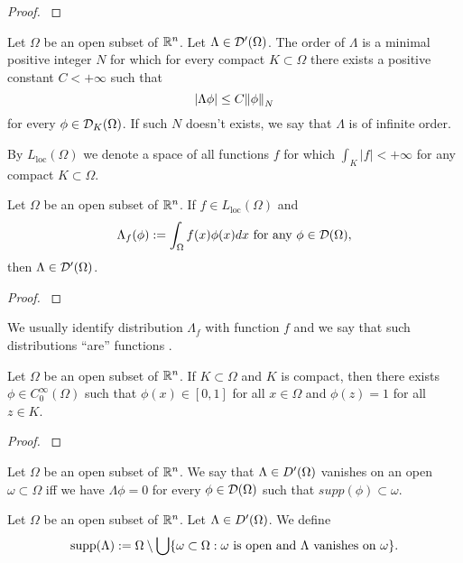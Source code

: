 \documentclass[main.tex]{subfiles}
\begin{document}
\begin{proof}
\cite[see][6.8]{rudin1991}
\end{proof}
\begin{definition}
\label{distribution-order}
Let $\Omega$ be an open subset of $\mathbb{R}^n$. Let $\Lambda\in\mathcal{D}'(\Omega)$. The order of $\Lambda$ is a minimal positive integer $N$ for which for every compact $K\subset\Omega$ there exists a positive constant $C<+\infty$ such that
\begin{equation}
|\Lambda\phi| \leq C\norm{\phi}_N
\end{equation}
for every $\phi\in\mathcal{D}_K(\Omega)$.
If such $N$ doesn't exists, we say that $\Lambda$ is of infinite order.
\end{definition}
By $L_\text{loc}(\Omega)$ we denote a space of all functions $f$ for which $\int_K |f| < +\infty$ for any compact $K\subset \Omega$.
\begin{theorem}
Let $\Omega$ be an open subset of $\mathbb{R}^n$. If $f\in L_\text{loc}(\Omega)$ and 
\begin{equation}
\Lambda_f(\phi) := \int_\Omega f(x)\phi(x)dx \text{ for any } \phi\in\mathcal{D}(\Omega),
\end{equation}
then $\Lambda\in\mathcal{D}'(\Omega)$.
\end{theorem}
\begin{proof}
\cite[see][6.11]{rudin1991}
\end{proof}
We usually identify distribution $\Lambda_f$ with function $f$ and we say that such distributions ``are'' functions \cite[see][6.11]{rudin1991}.
\begin{theorem}
\label{probe-function-compact-aprox}
Let $\Omega$ be an open subset of $\mathbb{R}^n$. If $K\subset\Omega$ and $K$ is compact, then there exists $\phi\in C^\infty_0(\Omega)$ such that $\phi(x)\in[0,1]$ for all $x\in\Omega$ and $\phi(z) = 1$ for all $z\in K$. 
\end{theorem}
\begin{proof}
\cite[see][Chapter 3. Sobolev Spaces. 3.1. Introduction]{miklavcic1998}
\end{proof}
\begin{definition}
Let $\Omega$ be an open subset of $\mathbb{R}^n$. We say that 
$\Lambda\in\\D'(\Omega)$ vanishes on an open $\omega\subset\Omega$ iff
we have $\Lambda\phi = 0$ for every $\phi\in\mathcal{D}(\Omega)$ such that $supp(\phi)\subset\omega$.
\end{definition}
\begin{definition}
Let $\Omega$ be an open subset of $\mathbb{R}^n$. Let $\Lambda\in\\D'(\Omega)$. We define
\begin{equation}
\text{supp}(\Lambda) := \Omega \setminus \bigcup 
\{\omega\subset \Omega: \omega \text{ is open and } \Lambda \text{ vanishes on } \omega\}.
\end{equation}
\end{definition}
\end{document}
